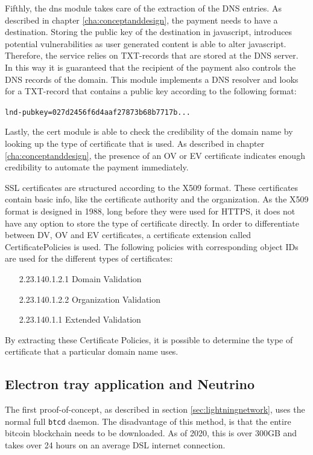 Fifthly, the dns module takes care of the extraction of the DNS entries. As described in chapter \ref{cha:conceptanddesign}, the payment needs to have a destination. Storing the public key of the destination in javascript, introduces potential vulnerabilities as user generated content is able to alter javascript. Therefore, the service relies on TXT-records that are stored at the DNS server. In this way it is guaranteed that the recipient of the payment also controls the DNS records of the domain. This module implements a DNS resolver and looks for a TXT-record that contains a public key according to the following format:

\texttt{lnd-pubkey=027d2456f6d4aaf27873b68b7717b...}

Lastly, the cert module is able to check the credibility of the domain name by looking up the type of certificate that is used. As described in chapter \ref{cha:conceptanddesign}, the presence of an OV or EV certificate indicates enough credibility to automate the payment immediately. 

SSL certificates are structured according to the X509 format. These certificates contain basic info, like the certificate authority and the organization. As the X509 format is designed in 1988, long before they were used for HTTPS, it does not have any option to store the type of certificate directly. In order to differentiate between DV, OV and EV certificates, a certificate extension called CertificatePolicies is used. The following policies with corresponding object IDs are used for the different types of certificates:

\begin{enumerate}[leftmargin=8em]
  \item[2.23.140.1.2.1] Domain Validation
  \item[2.23.140.1.2.2] Organization Validation
  \item[2.23.140.1.1] Extended Validation
\end{enumerate}

By extracting these Certificate Policies, it is possible to determine the type of certificate that a particular domain name uses. 

\subsection{Electron tray application and Neutrino}
\label{sec:electron}
The first proof-of-concept, as described in section \ref{sec:lightningnetwork}, uses the normal full \texttt{btcd} daemon. The disadvantage of this method, is that the entire bitcoin blockchain needs to be downloaded. As of 2020, this is over 300GB and takes over 24 hours on an average DSL internet connection. 

